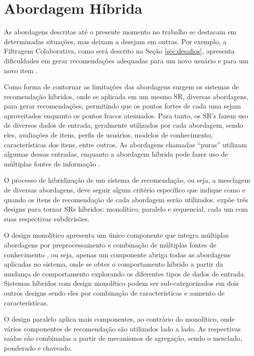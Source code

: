 \section{Abordagem Híbrida}

    As abordagens descritas até o presente momento no trabalho se destacam em determinadas situações, mas deixam a desejam em outras. Por exemplo, a Filtragem Colaborativa, como será descrito na Seção \ref{sec:desafios}, apresenta dificuldades em gerar recomendações adequadas para um novo usuário e para um novo item \cite{Ricci2010}. 
    
    Como forma de contornar as limitações das abordagens surgem os sistemas de recomendação híbridos, onde se aplicada em um mesmo SR, diversas abordagens, para gerar recomendações, permitindo que os pontos fortes de cada uma sejam aproveitados enquanto os pontos fracos atenuados. Para tanto, os SR's fazem uso de diversos dados de entrada, geralmente utilizados por cada abordagem, sendo eles, avaliações de itens, perfis de usuários, modelos de conhecimento, características dos itens, entre outros. As abordagens chamadas ``puras'' utilizam algumas dessas entradas, enquanto a abordagem híbrida pode fazer uso de múltiplas fontes de informação \cite{Jannach2010}.
    
    O processo de hibridização de um sistema de recomendação, ou seja, a mesclagem de diversas abordagens, deve seguir algum critério específico que indique como e quando os itens de recomendação de cada abordagem serão utilizados.  expõe três designs para tornar SRs híbridos: monolítico, paralelo e sequencial, cada um com suas respectivas subdivisões.
    
    O design monolítico apresenta um único componente que integra múltiplas abordagens por preprocessamento e combinação de múltiplas fontes de conhecimento \cite{Jannach2010}, ou seja, apenas um componente abriga todas as abordagens aplicadas no sistema, onde se obter o comportamento híbrido a partir da mudança de comportamento explorando os diferentes tipos de dados de entrada. Sistemas híbridos com design monolítico podem ser sub-categorizados em dois outros designs sendo eles por combinação de características e aumento de características.
    
    O design paralelo aplica mais componentes, ao contrário do monolítico, onde vários componentes de recomendação são utilizados lado a lado. As respectivas saídas são combinadas a partir de mecanismos de agregação, sendo o mesclado, ponderado e chaveado. 
    

